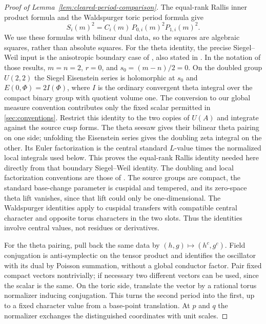 \begin{proof}[Proof of Lemma~\ref{lem:cleared-period-comparison}]
The equal-rank Rallis inner product formula and the Waldspurger toric
period formula give
\begin{equation}\label{eq:binary-period-comparison}
 S_i(m)^2=C_i(m)\,P_{0,i}(m)^2P_{1,i}(m)^2.
\end{equation}
We use these formulas with bilinear dual data, so the squares are
algebraic squares, rather than absolute squares.  For the theta
identity, the precise Siegel--Weil input is the anisotropic boundary
case of \cite[Theorems~2.1(i) and~2.2(i)]{Yamana2011}, also stated in
\cite[Theorem~7.1]{GanQiuTakeda2014}.  In the notation of those results,
$m=n=2$, $r=0$, and $s_0=(m-n)/2=0$.  On the doubled group $U(2,2)$
the Siegel Eisenstein series is holomorphic at $s_0$ and
$E(0,\Phi)=2I(\Phi)$, where $I$ is the ordinary convergent theta
integral over the compact binary group with quotient volume one.
The conversion to our global measure convention contributes only
the fixed scalar permitted in \cref{sec:conventions}.
Restrict this identity to
the two copies of $U(A)$ and integrate against the source cusp forms.
The theta seesaw gives their bilinear theta pairing on one side;
unfolding the Eisenstein series gives the doubling zeta integral on
the other.  Its Euler factorization is the central standard $L$-value
times the normalized local integrals used below.  This proves the
equal-rank Rallis identity needed here directly from that boundary
Siegel--Weil identity.  The doubling and local factorization
conventions are those of \cite[Sections~11.3, 11.5--11.6]{GanQiuTakeda2014}.
The source groups are compact, the standard base-change parameter is
cuspidal and tempered, and its zero-space theta lift vanishes, since
that lift could only be one-dimensional.  The Waldspurger identities
\cite[Section~II.7 and Section~III.3, Proposition~7]{Waldspurger1985} apply to cuspidal
transfers with compatible
central character and opposite torus characters in the two slots.
Thus the identities involve central values, not residues or derivatives.

For the theta pairing, pull back the same data by $(h,g)\mapsto(h^c,g^c)$.
Field conjugation is anti-symplectic on the tensor product and identifies
the oscillator with its dual by Poisson summation, without a global
conductor factor.  Pair fixed compact vectors nontrivially; if
necessary two different vectors can be used, since the scalar is the
same.  On the toric side, translate the vector by a rational torus
normalizer inducing conjugation.  This turns the second period into
the first, up to a fixed character value from a base-point translation.
At $p$ and $q$ the normalizer exchanges the distinguished coordinates
with unit scales.


\end{proof}
